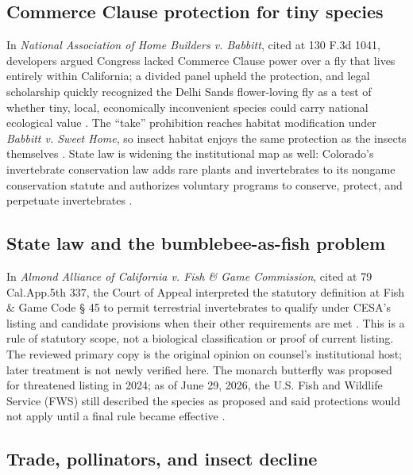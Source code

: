 \documentclass[
  english,
]{article}
\begin{document}
\subsection{Commerce Clause protection for tiny
species}\label{commerce-clause-protection-for-tiny-species}

In \emph{National Association of Home Builders v. Babbitt}, cited at 130
F.3d 1041, developers argued Congress lacked Commerce Clause power over
a fly that lives entirely within California; a divided panel upheld the
protection, and legal scholarship quickly recognized the Delhi Sands
flower-loving fly as a test of whether tiny, local, economically
inconvenient species could carry national ecological value
\citep{homebuilders1997, nagle1998delhi}. The ``take'' prohibition
reaches habitat modification under \emph{Babbitt v. Sweet Home}, so
insect habitat enjoys the same protection as the insects themselves
\citep{sweethome1995}. State law is widening the institutional map as
well: Colorado's invertebrate conservation law adds rare plants and
invertebrates to its nongame conservation statute and authorizes
voluntary programs to conserve, protect, and perpetuate invertebrates
\citep{co_hb24_1117}.

\subsection{State law and the bumblebee-as-fish
problem}\label{state-law-and-the-bumblebee-as-fish-problem}

In \emph{Almond Alliance of California v. Fish \& Game Commission},
cited at 79 Cal.App.5th 337, the Court of Appeal interpreted the
statutory definition at Fish \& Game Code § 45 to permit terrestrial
invertebrates to qualify under CESA's listing and candidate provisions
when their other requirements are met \citep{depth_almond}. This is a
rule of statutory scope, not a biological classification or proof of
current listing. The reviewed primary copy is the original opinion on
counsel's institutional host; later treatment is not newly verified
here. The monarch butterfly was proposed for threatened listing in 2024;
as of June 29, 2026, the U.S. Fish and Wildlife Service (FWS) still
described the species as proposed and said protections would not apply
until a final rule became effective
\citep{fws2024monarch, fws_monarch_status}.

\subsection{Trade, pollinators, and insect
decline}\label{trade-pollinators-and-insect-decline}
\end{document}

